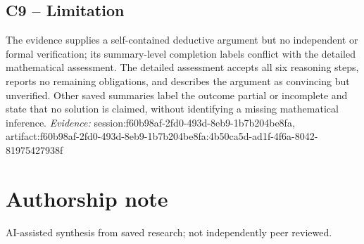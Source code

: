 \documentclass[11pt]{article}
\begin{document}
\subsection{C9 -- Limitation}
The evidence supplies a self-contained deductive argument but no independent or formal verification; its summary-level completion labels conflict with the detailed mathematical assessment.
The detailed assessment accepts all six reasoning steps, reports no remaining obligations, and describes the argument as convincing but unverified. Other saved summaries label the outcome partial or incomplete and state that no solution is claimed, without identifying a missing mathematical inference.
\textit{Evidence: }session:f60b98af-2fd0-493d-8eb9-1b7b204be8fa, artifact:f60b98af-2fd0-493d-8eb9-1b7b204be8fa:4b50ca5d-ad1f-4f6a-8042-81975427938f
\section*{Authorship note}
AI-assisted synthesis from saved research; not independently peer reviewed.
\end{document}
